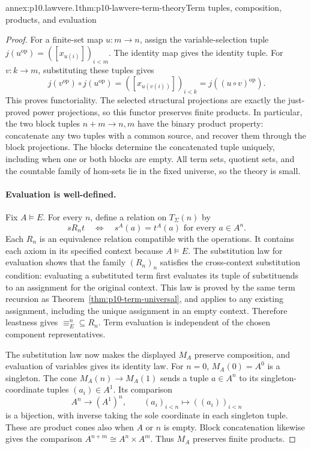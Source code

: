 \begin{annexitem}{annex:p10.lawvere.1}{thm:p10-lawvere-term-theory}{Term tuples, composition, products, and evaluation}
\begin{proof}
For a finite-set map \(u:m\to n\), assign the variable-selection
tuple \(j(u^{\mathrm{op}})=([x_{u(i)}])_{i<m}\).
The identity map gives the identity tuple.
For \(v:k\to m\), substituting these tuples gives
\[
       j(v^{\mathrm{op}})\circ j(u^{\mathrm{op}})
                         =([x_{u(v(i))}])_{i<k}
                         =j((u\circ v)^{\mathrm{op}}).
\]
This proves functoriality.
The selected structural projections are exactly the just-proved
power projections, so this functor preserves finite products.
In particular, the two block tuples \(n+m\to n,m\) have the
binary product property: concatenate any two tuples with a
common source, and recover them through the block projections.
The blocks determine the concatenated tuple uniquely, including
when one or both blocks are empty.
All term sets, quotient sets, and the countable family of
hom-sets lie in the fixed universe, so the theory is small.

\paragraph{Evaluation is well-defined.}
Fix \(A\models E\).
For every \(n\), define a relation on \(T_\Sigma(n)\) by
\[
       s\mathrel{R_n}t
             \quad\Longleftrightarrow\quad
       s^A(a)=t^A(a)\text{ for every }a\in A^n.
\]
Each \(R_n\) is an equivalence relation compatible with
the operations.  It contains each axiom in its specified
context because \(A\models E\).
The substitution law for evaluation shows that the family
\((R_n)_n\) satisfies the cross-context substitution condition:
evaluating a substituted term first evaluates its tuple of
substituends to an assignment for the original context.
This law is proved by the same term recursion as
Theorem~\ref{thm:p10-term-universal}, and applies to any existing
assignment, including the unique assignment in an empty context.
Therefore leastness gives \(\equiv_E^n\subseteq R_n\).
Term evaluation is independent of the chosen component
representatives.

The substitution law now makes the displayed \(M_A\) preserve
composition, and evaluation of variables gives its identity
law.  For \(n=0\), \(M_A(0)=A^0\) is a singleton.
The cone \(M_A(n)\to M_A(1)\) sends a tuple \(a\in A^n\) to
its singleton-coordinate tuples \((a_i)\in A^1\).
Its comparison
\[
                 A^n\longrightarrow(A^1)^n,\qquad
                 (a_i)_{i<n}\longmapsto((a_i))_{i<n}
\]
is a bijection, with inverse taking the sole coordinate in
each singleton tuple.  These are product cones also when
\(A\) or \(n\) is empty.  Block concatenation likewise gives
the comparison \(A^{n+m}\cong A^n\times A^m\).
Thus \(M_A\) preserves finite products.


\end{proof}
\end{annexitem}
